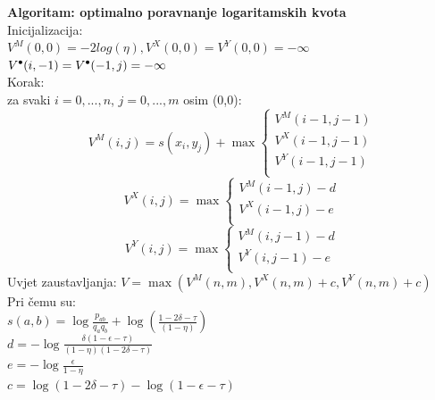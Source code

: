 \documentclass[a4paper]{article}
\newcommand\tab[1][1cm]{\hspace*{#1}}
\newcommand\sbullet[1][.5]{\mathbin{\vcenter{\hbox{\scalebox{#1}{$\bullet$}}}}}
\begin{document}
\textbf{Algoritam: optimalno poravnanje logaritamskih kvota} \cite{hmm_algorithms} 	 \\
Inicijalizacija: \\
\tab \tab $V^M(0,0) = - 2 log(\eta), V^X(0,0) = V^Y(0,0) = -\infty$\\
\tab \tab $V^{\sbullet[.75]}(i,-1) = V^{\sbullet[.75]}(-1,j) = -\infty$\\
Korak:\\
\tab za svaki $i=0,...,n$, $j=0,...,m$ osim (0,0):\\
\begin{equation}
     V^M(i,j) = s(x_i,y_j) + \max
    \begin{cases}
      V^M(i-1,j-1)\\
      V^X(i-1,j-1)\\
      V^Y(i-1,j-1)\\          
    \end{cases}
\end{equation}
\begin{equation}
     V^X(i,j) = \max
    \begin{cases}
      V^M(i-1,j) - d\\
      V^X(i-1,j) - e\\
    \end{cases}   
\end{equation}
\begin{equation}
     V^Y(i,j) = \max
    \begin{cases}
      V^M(i,j-1) -d\\
      V^Y(i,j-1) - e\\         
    \end{cases}
\end{equation}
Uvjet zaustavljanja:
$V = \max(V^M(n,m), V^X(n,m) + c , V^Y(n,m) + c )$ \\
Pri čemu su:\\
	\tab$s(a,b) = \log\frac{p_{ab}}{q_a q_b} + \log(\frac{1 - 2\delta - \tau }{(1-\eta)})$\\
    \tab$d = -\log\frac{\delta(1-\epsilon - \tau)}{(1-\eta)(1-2\delta - \tau)}$\\
    \tab$e = -\log\frac{\epsilon}{1-\eta}$\\
	\tab$c = \log( 1 - 2\delta - \tau) - \log(1-\epsilon - \tau)$
	
	
	
\end{document}
